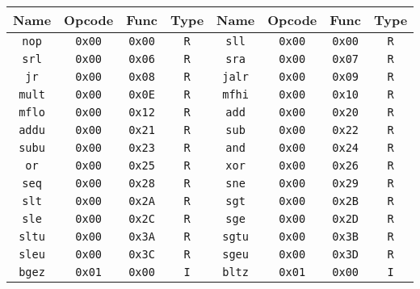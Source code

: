 \begin{table}[!ht]
    \centering
    \begin{tabular}{ |c|c|c|c||c|c|c|c| }
        \hline
        Name & Opcode & Func & Type & Name & Opcode & Func & Type \\

        \hline
        \verb|nop| & \verb|0x00| & \verb|0x00| & \verb|R| & \verb|sll| & \verb|0x00| & \verb|0x00| & \verb|R| \\
        \hline
        \verb|srl| & \verb|0x00| & \verb|0x06| & \verb|R| & \verb|sra| & \verb|0x00| & \verb|0x07| & \verb|R| \\
        \hline
        \verb|jr| & \verb|0x00| & \verb|0x08| & \verb|R| & \verb|jalr| & \verb|0x00| & \verb|0x09| & \verb|R| \\
        \hline
        \verb|mult| & \verb|0x00| & \verb|0x0E| & \verb|R| & \verb|mfhi| & \verb|0x00| & \verb|0x10| & \verb|R| \\
        \hline
        \verb|mflo| & \verb|0x00| & \verb|0x12| & \verb|R| & \verb|add| & \verb|0x00| & \verb|0x20| & \verb|R| \\
        \hline
        \verb|addu| & \verb|0x00| & \verb|0x21| & \verb|R| & \verb|sub| & \verb|0x00| & \verb|0x22| & \verb|R| \\
        \hline
        \verb|subu| & \verb|0x00| & \verb|0x23| & \verb|R| & \verb|and| & \verb|0x00| & \verb|0x24| & \verb|R| \\
        \hline
        \verb|or| & \verb|0x00| & \verb|0x25| & \verb|R| & \verb|xor| & \verb|0x00| & \verb|0x26| & \verb|R| \\
        \hline
        \verb|seq| & \verb|0x00| & \verb|0x28| & \verb|R| & \verb|sne| & \verb|0x00| & \verb|0x29| & \verb|R| \\
        \hline
        \verb|slt| & \verb|0x00| & \verb|0x2A| & \verb|R| & \verb|sgt| & \verb|0x00| & \verb|0x2B| & \verb|R| \\
        \hline
        \verb|sle| & \verb|0x00| & \verb|0x2C| & \verb|R| & \verb|sge| & \verb|0x00| & \verb|0x2D| & \verb|R| \\
        \hline
        \verb|sltu| & \verb|0x00| & \verb|0x3A| & \verb|R| & \verb|sgtu| & \verb|0x00| & \verb|0x3B| & \verb|R| \\
        \hline
        \verb|sleu| & \verb|0x00| & \verb|0x3C| & \verb|R| & \verb|sgeu| & \verb|0x00| & \verb|0x3D| & \verb|R| \\
        \hline
        \verb|bgez| & \verb|0x01| & \verb|0x00| & \verb|I| & \verb|bltz| & \verb|0x01| & \verb|0x00| & \verb|I| \\

\end{tabular}
\end{table}
